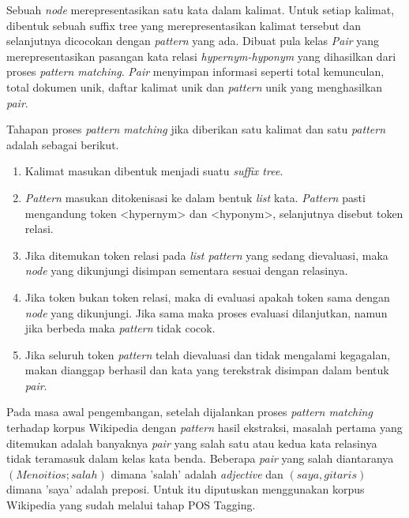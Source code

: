 Sebuah \textit{node} merepresentasikan satu kata dalam kalimat. Untuk setiap kalimat, dibentuk sebuah suffix tree yang merepresentasikan kalimat tersebut dan selanjutnya dicocokan dengan \textit{pattern} yang ada. Dibuat pula kelas \textit{Pair} yang merepresentasikan pasangan kata relasi \textit{hypernym-hyponym} yang dihasilkan dari proses \textit{pattern matching}. \textit{Pair} menyimpan informasi seperti total kemunculan, total dokumen unik, daftar kalimat unik dan \textit{pattern} unik yang menghasilkan \textit{pair}.

Tahapan proses \textit{pattern matching} jika diberikan satu kalimat dan satu \textit{pattern} adalah sebagai berikut.
\begin{enumerate}
  \item Kalimat masukan dibentuk menjadi suatu \textit{suffix tree}.
  \item \textit{Pattern} masukan ditokenisasi ke dalam bentuk \textit{list} kata. \textit{Pattern} pasti mengandung token <hypernym> dan <hyponym>, selanjutnya disebut token relasi.
  \item Jika ditemukan token relasi pada \textit{list pattern} yang sedang dievaluasi, maka \textit{node} yang dikunjungi disimpan sementara sesuai dengan relasinya.
  \item Jika token bukan token relasi, maka di evaluasi apakah token sama dengan \textit{node} yang dikunjungi. Jika sama maka proses evaluasi dilanjutkan, namun jika berbeda maka \textit{pattern} tidak cocok.
  \item Jika seluruh token \textit{pattern} telah dievaluasi dan tidak mengalami kegagalan, makan dianggap berhasil dan kata yang terekstrak disimpan dalam bentuk \textit{pair}.
\end{enumerate}

Pada masa awal pengembangan, setelah dijalankan proses \textit{pattern matching} terhadap korpus Wikipedia dengan \textit{pattern} hasil ekstraksi, masalah pertama yang ditemukan adalah banyaknya \textit{pair} yang salah satu atau kedua kata relasinya tidak teramasuk dalam kelas kata benda. Beberapa \textit{pair} yang salah diantaranya $(Menoitios;salah)$ dimana 'salah' adalah \textit{adjective} dan $(saya,gitaris)$ dimana 'saya' adalah preposi. Untuk itu diputuskan menggunakan korpus Wikipedia yang sudah melalui tahap POS Tagging.

